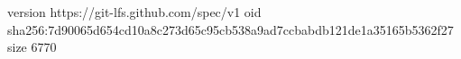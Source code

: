 version https://git-lfs.github.com/spec/v1
oid sha256:7d90065d654cd10a8c273d65c95cb538a9ad7ccbabdb121de1a35165b5362f27
size 6770
